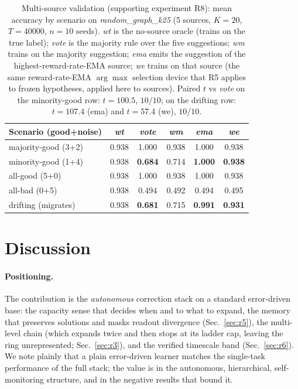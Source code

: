 \documentclass[preprint,12pt]{elsarticle}
\begin{document}
\begin{table}[t]
\centering
\footnotesize
\caption{Multi-source validation (supporting experiment R8): mean accuracy by
scenario on \textit{random\_graph\_k25} (5 sources, $K{=}20$, $T{=}40000$,
$n=10$ seeds).
\textit{wt} is the no-source oracle (trains on the true label);
\textit{vote} is the majority rule over the five suggestions;
\textit{wm} trains on the majority suggestion; \textit{ema} emits the
suggestion of the highest-reward-rate-EMA source; \textit{we} trains on
that source (the same reward-rate-EMA $\arg\max$ selection device that R5
applies to frozen hypotheses, applied here to sources). Paired $t$ vs
\textit{vote} on the
minority-good row: $t{=}100.5$, $10/10$; on the drifting row: $t{=}107.4$
(ema) and $t{=}57.4$ (we), $10/10$.}
\label{tab:multisource}
\begin{tabular}{@{}lccccc@{}}
\toprule
Scenario (good+noise) & \textit{wt} & \textit{vote} &
\textit{wm} & \textit{ema} & \textit{we} \\
\midrule
majority-good (3+2) & 0.938 & 1.000 & 0.938 & 1.000 & 0.938 \\
minority-good (1+4) & 0.938 & \textbf{0.684} & 0.714 & \textbf{1.000} & \textbf{0.938} \\
all-good (5+0) & 0.938 & 1.000 & 0.938 & 1.000 & 0.938 \\
all-bad (0+5) & 0.938 & 0.494 & 0.492 & 0.494 & 0.495 \\
drifting (migrates) & 0.938 & \textbf{0.681} & 0.715 & \textbf{0.991} & \textbf{0.931} \\
\bottomrule
\end{tabular}
\end{table}

\section{Discussion}
\label{sec:disc}

\paragraph{Positioning.} The contribution is the \emph{autonomous}
correction stack on a standard error-driven base: the capacity sense that
decides when and to what to expand, the memory that preserves solutions and
masks readout divergence (Sec.~\ref{sec:r5}), the multi-level chain (which
expands twice and then stops at its ladder cap, leaving the ring
unrepresented; Sec.~\ref{sec:r3}), and the verified timescale band
(Sec.~\ref{sec:r6}). We note plainly
that a plain error-driven learner matches the single-task performance of
the full stack; the value is in the autonomous, hierarchical,
self-monitoring structure, and in the negative results that bound it.
\end{document}

